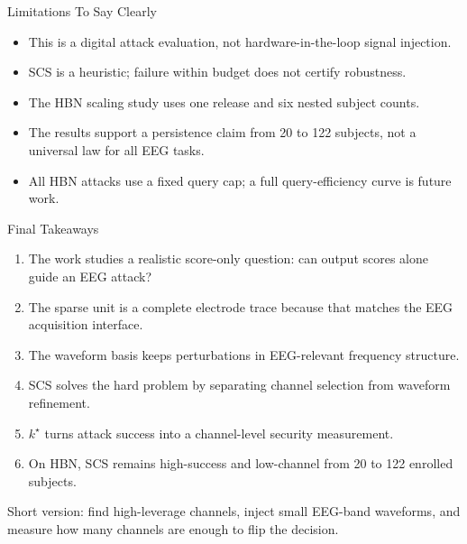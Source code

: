 \documentclass[aspectratio=169,11pt]{beamer}
\newcommand{\smallgap}{\vspace{0.45em}}
\begin{document}
\begin{frame}{Limitations To Say Clearly}
\begin{itemize}
  \item This is a digital attack evaluation, not hardware-in-the-loop signal injection.
  \item SCS is a heuristic; failure within budget does not certify robustness.
  \item The HBN scaling study uses one release and six nested subject counts.
  \item The results support a persistence claim from 20 to 122 subjects, not a universal law for all EEG tasks.
  \item All HBN attacks use a fixed query cap; a full query-efficiency curve is future work.
\end{itemize}
\end{frame}

\begin{frame}{Final Takeaways}
\begin{enumerate}
  \item The work studies a realistic score-only question: can output scores alone guide an EEG attack?
  \item The sparse unit is a complete electrode trace because that matches the EEG acquisition interface.
  \item The waveform basis keeps perturbations in EEG-relevant frequency structure.
  \item SCS solves the hard problem by separating channel selection from waveform refinement.
  \item \(k^\star\) turns attack success into a channel-level security measurement.
  \item On HBN, SCS remains high-success and low-channel from 20 to 122 enrolled subjects.
\end{enumerate}

\smallgap
\begin{center}
\alert{Short version: find high-leverage channels, inject small EEG-band waveforms, and measure how many channels are enough to flip the decision.}
\end{center}
\end{frame}
\end{document}
